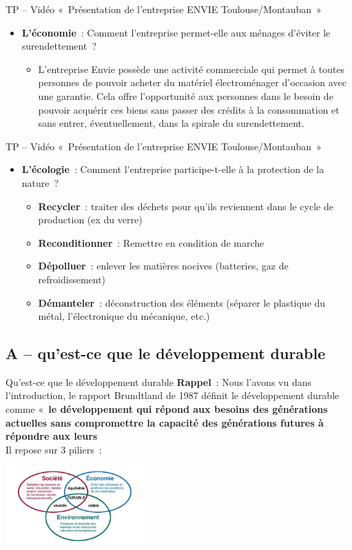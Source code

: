 \documentclass[C]{beamer}
\begin{document}
	\begin{frame}{TP -- Vidéo «~Présentation de l'entreprise ENVIE Toulouse/Montauban~»}
	\begin{itemize}
	\item \textbf{L'économie}~: Comment l'entreprise permet-elle aux ménages d'éviter le surendettement~?
		\begin{itemize}
		\item L'entreprise Envie possède une activité commerciale qui permet à toutes personnes de pouvoir acheter du matériel électroménager d'occasion avec une garantie. Cela offre l'opportunité aux personnes dans le besoin de pouvoir acquérir ces biens sans passer des crédits à la consommation et sans entrer, éventuellement, dans la spirale du surendettement.
		\end{itemize}
	\end{itemize}
	\end{frame}
	
	\begin{frame}{TP -- Vidéo «~Présentation de l'entreprise ENVIE Toulouse/Montauban~»}
	\begin{itemize}
	\item \textbf{L'écologie}~: Comment l'entreprise participe-t-elle à la protection de la nature~?
		\begin{itemize}
		\item \textbf{Recycler}~: traiter des déchets pour qu'ils reviennent dans le cycle de production (ex du verre)
		\item \textbf{Reconditionner}~: Remettre en condition de marche
		\item \textbf{Dépolluer}~: enlever les matières nocives (batteries, gaz de refroidissement)
		\item \textbf{Démanteler}~: déconstruction des éléments (séparer le plastique du métal, l'électronique du mécanique, etc.)
		\end{itemize}
	\end{itemize}
	\end{frame}
	
	
	\subsection*{A -- qu'est-ce que le développement durable}
	\begin{frame}{Qu'est-ce que le développement durable}
	\textbf{Rappel}~: Nous l'avons vu dans l'introduction, le rapport Brundtland de 1987 définit le développement durable comme «~\textbf{le développement qui répond aux besoins des générations actuelles sans compromettre la capacité des générations futures à répondre aux leurs}\\
	Il repose sur 3 piliers~:
	\begin{center}
	\includegraphics[height=3cm]{images/carte_1_16.jpg}
	\end{center}
	\end{frame}
	
\end{document}
